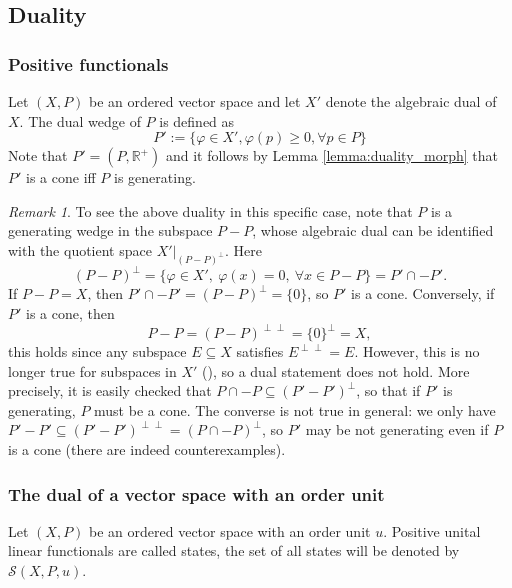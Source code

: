 \documentclass[12pt]{article}
\theoremstyle{remark}
\newtheorem{rem}{Remark}
\newcommand{\<}{\langle}
\begin{document}
\subsection{Duality}
\subsubsection*{Positive functionals}

Let $(X,P)$ be an ordered vector space and let $X'$ denote the algebraic dual of $X$. The dual wedge of $P$ is defined as
\[
P':=\{\varphi\in X', \varphi(p)\ge 0, \forall p\in P\}
\]
  Note that  $P'=(P,\mathbb R^+)$ and it follows by  Lemma \ref{lemma:duality_morph} that 
	$P'$ is a cone iff $P$ is generating. 
	
\begin{rem}
To see the above duality in this specific case, note that $P$ is a generating wedge in the subspace $P-P$, whose algebraic dual can be identified with the quotient space $X'|_{(P-P)^\perp}$. Here
\[
(P-P)^\perp=\{\varphi\in X',\ \varphi(x)=0,\ \forall x\in P-P\}=P'\cap-P'.
\]
If $P-P=X$, then $P'\cap-P'=(P-P)^\perp=\{0\}$, so $P'$ is a cone. Conversely, if $P'$ is a cone, then 
\[
P-P=(P-P)^{\perp\perp}=\{0\}^\perp=X,
\]
this holds since any subspace $E\subseteq X$ satisfies $E^{\perp\perp}=E$. However, this is no longer true for subspaces in $X'$ (\cite{kothe}), so a dual statement does not hold. More precisely, it is easily checked that $P\cap -P\subseteq (P'-P')^\perp$, so that 
 if $P'$ is generating, $P$ must be a cone. The converse is not true in general: we only have $P'-P'\subseteq (P'-P')^{\perp\perp}=
 (P\cap -P)^\perp$, so $P'$ may be not generating even if $P$ is a cone (there are indeed counterexamples).
\end{rem}


\subsubsection*{The  dual of a vector space with an order unit } 


Let $(X,P)$ be an ordered vector space with an order unit $u$. Positive unital linear functionals are called states, the set of all 
 states will be denoted by $\mathcal S(X,P,u)$.
\end{document}
